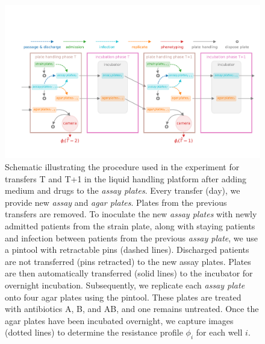 \begin{figure}[p]
  \centering
  \includegraphics[width = \linewidth]{chapter_2_sup/figures/setup.pdf}
  \caption{
    Schematic illustrating the procedure used in the experiment for transfers T and T+1  in the liquid handling platform after adding medium and drugs to the \textit{assay plates}.
    Every transfer (day), we provide new  \textit{assay} and \textit{agar plates}.
    Plates from the previous transfers are removed.
    To inoculate the new \textit{assay plates} with newly admitted patients from the strain plate, along with staying patients and infection between patients from the previous \textit{assay plate}, we use a pintool with retractable pins (dashed lines).
    Discharged patients are not transferred (pins retracted) to the new assay plates.
  Plates are then automatically transferred (solid lines) to the incubator for overnight incubation. Subsequently, we replicate each \textit{assay plate} onto four agar plates using the pintool. These plates are treated with antibiotics A, B, and AB, and one remains untreated. Once the agar plates have been incubated overnight, we capture images (dotted lines) to determine the resistance profile $\phi_i$ for each well $i$.}
  \label{fig:procedure}
\end{figure}

